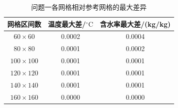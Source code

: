 \begin{table}[!htbp]\centering\small
\caption{问题一各网格相对参考网格的最大差异}\label{tab:q1-grid}
\renewcommand{\arraystretch}{1.15}
\begin{tabular*}{0.96\textwidth}{@{\extracolsep{\fill}}ccc}
\toprule
网格区间数 & 温度最大差/$ {}^\circ\mathrm{C}$ & 含水率最大差/(kg/kg)\\\midrule
$ 60\times 60$ & 0.0002 & 0.0004\\
$ 80\times 80$ & 0.0001 & 0.0002\\
$ 100\times 100$ & 0.0001 & 0.0001\\
$ 120\times 120$ & 0.0001 & 0.0001\\
$ 140\times 140$ & 0.0001 & 0.0001\\
$ 160\times 160$ & 0.0000 & 0.0000\\
\bottomrule
\end{tabular*}
\par{}
\end{table}
